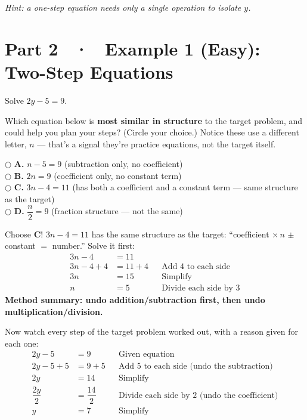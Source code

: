 \documentclass[11pt]{article}
\newcommand{\choice}[2]{\hspace{2mm}$\bigcirc$\; \textbf{#1.} #2}
\begin{document}
\vspace{1mm}
\textit{Hint: a one-step equation needs only a single operation to isolate $y$.}

\newpage
\section*{Part 2 \ · \ Example 1 (Easy): Two-Step Equations}

\begin{targetbox}
Solve \; $2y - 5 = 9$.
\end{targetbox}

\begin{choosebox}
Which equation below is \textbf{most similar in structure} to the target problem, and could help you plan your steps? (Circle your choice.) Notice these use a different letter, $n$ --- that's a signal they're practice equations, not the target itself.

\choice{A}{$n - 5 = 9$ \quad (subtraction only, no coefficient)}\\[1mm]
\choice{B}{$2n = 9$ \quad (coefficient only, no constant term)}\\[1mm]
\choice{C}{$3n - 4 = 11$ \quad (has both a coefficient and a constant term --- same structure as the target)}\\[1mm]
\choice{D}{$\dfrac{n}{2} = 9$ \quad (fraction structure --- not the same)}
\end{choosebox}

\begin{helperbox}
Choose \textbf{C}! $3n - 4 = 11$ has the same structure as the target: ``coefficient $\times\, n$ $\pm$ constant $=$ number.'' Solve it first:
\begin{align*}
3n - 4 &= 11\\
3n - 4 + 4 &= 11 + 4 &&\text{Add 4 to each side}\\
3n &= 15 &&\text{Simplify}\\
n &= 5 &&\text{Divide each side by 3}
\end{align*}
\textbf{Method summary: undo addition/subtraction first, then undo multiplication/division.}
\end{helperbox}

\begin{applybox}
Now watch every step of the target problem worked out, with a reason given for each one:
\begin{align*}
2y - 5 &= 9 &&\text{Given equation}\\
2y - 5 + 5 &= 9 + 5 &&\text{Add 5 to each side (undo the subtraction)}\\
2y &= 14 &&\text{Simplify}\\
\dfrac{2y}{2} &= \dfrac{14}{2} &&\text{Divide each side by 2 (undo the coefficient)}\\
y &= 7 &&\text{Simplify}
\end{align*}
\end{applybox}
\end{document}

